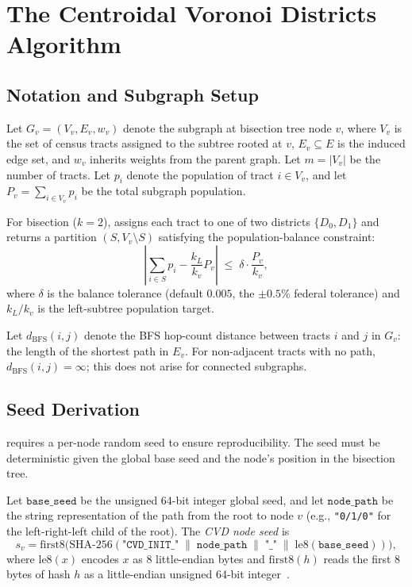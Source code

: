 \section{The Centroidal Voronoi Districts Algorithm}
\label{sec:algorithm}

\subsection{Notation and Subgraph Setup}

Let $G_v = (V_v, E_v, w_v)$ denote the subgraph at bisection tree node $v$,
where $V_v$ is the set of census tracts assigned to the subtree rooted at $v$,
$E_v \subseteq E$ is the induced edge set, and $w_v$ inherits weights from the
parent graph.
Let $m = |V_v|$ be the number of tracts.
Let $p_i$ denote the population of tract $i \in V_v$, and let
$P_v = \sum_{i \in V_v} p_i$ be the total subgraph population.

For bisection ($k=2$), \cvd{} assigns each tract to one of two districts
$\{D_0, D_1\}$ and returns a partition $(S, V_v \setminus S)$ satisfying
the population-balance constraint:
\[
  \left|\sum_{i \in S} p_i - \frac{k_L}{k_v} P_v \right|
  \;\le\;
  \delta \cdot \frac{P_v}{k_v},
\]
where $\delta$ is the balance tolerance (default $0.005$, the $\pm 0.5\%$
federal tolerance) and $k_L / k_v$ is the left-subtree population target.

Let $d_{\mathrm{BFS}}(i, j)$ denote the BFS hop-count distance between
tracts $i$ and $j$ in $G_v$: the length of the shortest path in $E_v$.
For non-adjacent tracts with no path, $d_{\mathrm{BFS}}(i,j) = \infty$;
this does not arise for connected subgraphs.

\subsection{Seed Derivation}

\cvd{} requires a per-node random seed to ensure reproducibility.
The seed must be deterministic given the global base seed and the node's
position in the bisection tree.

\begin{definition}
\label{def:cvd-seed}
Let $\mathtt{base\_seed}$ be the unsigned 64-bit integer global seed, and let
$\mathtt{node\_path}$ be the string representation of the path from the root
to node $v$ (e.g., \texttt{"0/1/0"} for the left-right-left child of the root).
The \emph{CVD node seed} is
\[
  s_v = \mathrm{first8}\bigl(
    \mathrm{SHA\text{-}256}(
      \texttt{"CVD\_INIT\_"} \;\|\; \mathtt{node\_path}
      \;\|\; \texttt{"\_"} \;\|\; \mathrm{le8}(\mathtt{base\_seed})
    )
  \bigr),
\]
where $\mathrm{le8}(x)$ encodes $x$ as 8 little-endian bytes and
$\mathrm{first8}(h)$ reads the first 8 bytes of hash $h$ as a
little-endian unsigned 64-bit integer~\citep{sha256nist}.
\end{definition}

